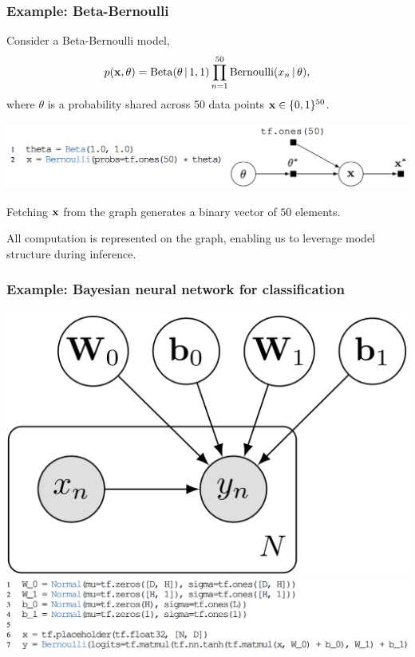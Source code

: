 \documentclass[10pt,
               xcolor={usenames,dvipsnames},
               hyperref={colorlinks,linktoc=all,citecolor=Plum,linkcolor=MidnightBlue,urlcolor=MidnightBlue},noamssymb]{beamer}
\begin{document}
\begin{frame}
\frametitle{Example: Beta-Bernoulli}
Consider a Beta-Bernoulli model,
\begin{align*}
p(\boldsymbol{\mathbf{x}}, \theta) =
\operatorname{Beta}(\theta\,|\, 1, 1)
\prod_{n=1}^{50} \operatorname{Bernoulli}(x_n\,|\, \theta),
\end{align*}
where $\theta$
is a probability shared across 50 data points $\boldsymbol{\mathbf{x}}\in\{0,1\}^{50}$.
\begin{center}
\vspace{-2ex}
\includegraphics[height=0.175\textwidth]{img/beta-bernoulli.png}
\end{center}
Fetching $\boldsymbol{\mathbf{x}}$ from the graph generates a binary vector of $50$ elements.

All computation is represented on the graph, enabling us to leverage model structure during inference.
\end{frame}

\begin{frame}
\frametitle{Example: Bayesian neural network for classification}
\begin{center}
\includegraphics[height=0.3\textwidth]{img/bayesian_nn_graph.png}
\\[2.5ex]
\includegraphics[height=0.19\textwidth]{img/bayesian_nn_program.png}
\end{center}
\end{frame}
\end{document}
